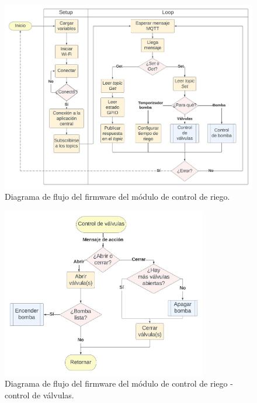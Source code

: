 \begin{figure}[!h]
	\centering
	\includegraphics[width=1.0\textwidth]{./Figures/chapter3/FirmwareRiegoControl.jpg}
	\caption[Diagrama de flujo del firmware del módulo de control de riego]{Diagrama de flujo del firmware del módulo de control de riego.}
	\label{fig:flow_riegocontrol}
\end{figure}

\begin{figure}[!h]
	\centering
	\includegraphics[width=0.8\textwidth]{./Figures/chapter3/FirmwareValveControl.jpg}
	\caption[Diagrama de flujo del firmware del módulo de control de riego - control de válvulas]{Diagrama de flujo del firmware del módulo de control de riego - control de válvulas.}
	\label{fig:flow_valvecontrol}
\end{figure}

